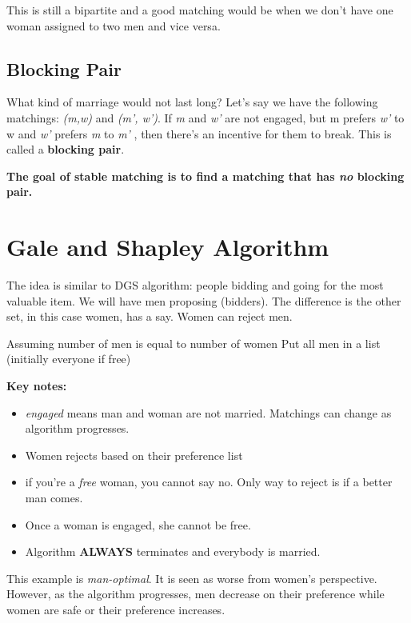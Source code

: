 \documentclass[twoside]{article}
\begin{document}
This is still a bipartite and a good matching would be when we don't  have one woman assigned to two men and vice versa.

\subsection*{Blocking Pair}
What kind of marriage would not last long? 
Let's say we have the following matchings: \textit{(m,w) }and \textit{(m', w')}. 
If \textit{m} and \textit{w'} are not engaged, but m prefers \textit{w'} to w and \textit{w'} prefers \textit{m} to \textit{m'} , then there's an incentive for them to break. This is called a \textbf{blocking pair}. 

\textbf{The goal of stable matching is to find a matching that has \textit{no} blocking pair. }

\section{Gale and Shapley Algorithm}
The idea is similar to DGS algorithm: people bidding and going for the most valuable item. We will have men proposing (bidders). The difference is the other set, in this case women, has a say. Women can reject men. \newline
\begin{algorithm}[H]
Assuming number of men is equal to number of women\;
 Put all men in a list (initially everyone if free)\;
\end{algorithm}

\textbf{Key notes:}
\begin{itemize}
\item \textit{engaged} means man and woman are not married. Matchings can change as algorithm progresses.
\item Women rejects based on their preference list
\item if you're a \textit{free} woman, you cannot say no. Only way to reject is if a better man comes.
\item Once a woman is engaged, she cannot be free.
\item Algorithm \textbf{ALWAYS} terminates and everybody is married.
\end{itemize}
This example is \textit{man-optimal}. It is seen as worse from women's perspective. However, as the algorithm progresses, men decrease on their preference while women are safe or their preference increases. 
\end{document}
